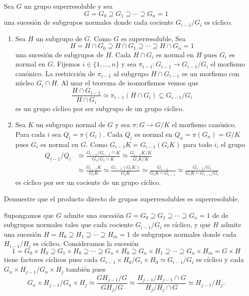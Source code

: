 \begin{svgraybox}
	Sea $G$ un grupo superresoluble y sea 			
	\[ 
	G=G_0\supseteq G_1\supseteq \cdots\supseteq G_n=1 
	\] 
	una sucesión de subgrupos normales
	donde cada cociente $G_{i-1}/G_{i}$ es cíclico. 
	\begin{enumerate}
		\item Sea $H$ un subgrupo de $G$. Como $G$ es
			superresoluble, Sea 
			\[
			H=H\cap G_0\supseteq H\cap G_1\supseteq\cdots\supseteq H\cap G_n=1
			\]
			una sucesión de subgrupos de $H$. Cada $H\cap G_i$ es normal en $H$
			pues $G_i$ es normal en $G$. Fijemos $i\in\{1,\dots,n\}$ y sea
			$\pi_{i-1}\colon G_{i-1}\to G_{i-1}/G_{i}$ el morfismo canónico. La
			restricción de $\pi_{i-1}$ al subgrupo $H\cap G_{i-1}$ es un morfismo con
			núcleo $G_{i}\cap H$.  Al usar el teorema de isomorfismos vemos que 
			\[
			\frac{H\cap G_{i-1}}{H\cap G_{i}}\simeq \pi_{i-1}(H\cap G_i)\subseteq G_{i-1}/G_i
			\]
			es un grupo cíclico por ser subgrupo de un grupo cíclico. 
		\item Sea $K$ un subgrupo normal de $G$ y sea $\pi\colon G\to G/K$ el
			morfismo canónico. Para cada $i$ sea $Q_i=\pi(G_i)$. Cada $Q_i$ es
			normal en $Q_n=\pi(G_n)=G/K$ pues $G_i$ es normal en $G$. Como
			$G_{i-1}K=G_{i-1}(G_iK)$ para todo $i$, 
			el grupo
			\begin{align*}
			Q_{i-1}/Q_i
			&\simeq\frac{G_{i-1}/G_{i-1}\cap K}{G_i/G_i\cap K}
			\simeq \frac{G_{i-1}K/K}{G_{i}K/K}\\
			&\simeq\frac{ G_{i-1}K}{G_iK}
			\simeq\frac{ G_{i-1}(G_iK)}{G_iK}
			\simeq\frac{ G_{i-1}}{G_iK\cap G_{i-1}}
			\simeq\frac{ G_{i-1}/G_i}{G_iK\cap G_{i-1}/G_i}
			\end{align*}
			es cíclico por ser un cociente de un grupo cíclico.
	\end{enumerate}
\end{svgraybox}

\begin{exercise}
	\label{exercise:directosuper}
	Demuestre que el producto directo de grupos superresolubles es
	superresoluble.
\end{exercise}

\begin{svgraybox}
	Supongamos que $G$ admite una sucesión $G=G_0\supseteq G_1\supseteq
	\cdots\supseteq G_n=1$ de de subgrupos normales tales que cada cociente
	$G_{i-1}/G_i$ es cíclico, y que $H$ admite una sucesión $H=H_0\supseteq
	H_1\supseteq \cdots\supseteq H_m=1$ de subgrupos normales donde cada
	$H_{i-1}/H_i$ es cíclico. Consideramos la sucesión 
	\[
		1=G_0\times H_0\supseteq G_1\times H_0\supseteq\cdots\supseteq G_n\times H_0\supseteq G_n\times H_1\supseteq \cdots\supseteq G_n\times H_m=G\times H
	\]
	tiene factores cíclicos pues 
	cada $G_{i-1}\times H_0/G_i\times H_0\simeq G_{i-1}/G_i$ es cíclico y cada 
	$G_n\times H_{j-1}/G_n\times H_j$ también pues
	\[
	G_n\times H_{j-1}/G_n\times H_j
	\simeq \frac{GH_{j-1}/G}{GH_j/G}
	\simeq \frac{H_{j-1}/H_{j-1}\cap G}{H_j/H_j\cap G}\simeq H_{j-1}/H_j.
	\]
\end{svgraybox}

